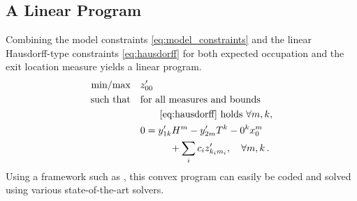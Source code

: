 \subsection{A Linear Program}
Combining the model constraints \eqref{eq:model_constraints} and the linear Hausdorff-type constraints \eqref{eq:hausdorff} for both expected occupation and the exit location measure yields a linear program.
\begin{equation}\label{eq:lp_for_fpt}
    \begin{split}
	    \text{min} / \text{max} \hspace{1em}&  z_{00}^{\prime} \\
        \text{such that}\hspace{1em} & \text{for all measures and bounds}\\
        &\qquad\eqref{eq:hausdorff}\text{ holds }\forall m, k,\\
        & 0= y_{1k}' H^m -  y_{2m}'T^k - 0^k x_0^m \\
	    &\qquad\quad+\sum_i c_i  z_{k_i m_i}', \quad\forall m, k\,.
    \end{split}
\end{equation}
Using a framework such as , this convex program can easily be coded and solved using various state-of-the-art solvers.

